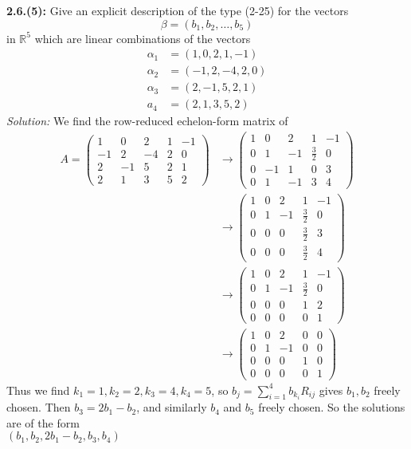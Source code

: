 \documentclass[a4paper]{article}
\theoremstyle{plain}%
\theoremstyle{definition}
\theoremstyle{remark}
\begin{document}
\textbf{2.6.(5):} Give an explicit description of the type (2-25) for the
vectors
\[
\beta = \left( b_1, b_2, \ldots, b_5 \right) 
\] 
in $\mathbb{R}^{5}$ which are linear combinations of the vectors
\begin{align*}
    \alpha_1 &= \left( 1, 0, 2, 1, -1 \right) \\
    \alpha_2 &= \left( -1,2,-4,2,0 \right) \\
    \alpha_3 &= \left( 2,-1,5,2,1 \right) \\
    a_4 &= \left( 2,1,3,5,2 \right) 
\end{align*}
\textit{Solution:} We find the row-reduced echelon-form matrix of
\begin{align*}
    A = \begin{pmatrix} 1 &0 & 2 & 1 &-1\\
        -1 & 2 & -4 & 2 &0\\
        2 & -1 & 5 & 2 &1\\
        2 & 1 & 3 & 5 & 2
    \end{pmatrix} 
    &\to 
    \begin{pmatrix} 
        1 & 0 & 2 & 1 & -1\\
        0 & 1 & -1 & \frac{3}{2} & 0\\
        0 & -1 & 1 & 0 & 3\\
        0 & 1 & -1 & 3 & 4
    \end{pmatrix} \\
    &\to 
    \begin{pmatrix} 
        1 & 0 & 2 & 1 & -1\\
        0 & 1 & -1 & \frac{3}{2} & 0\\
        0 & 0 & 0 & \frac{3}{2} & 3\\
        0 & 0 & 0 & \frac{3}{2} & 4
    \end{pmatrix} \\
    &\to 
    \begin{pmatrix} 
        1 & 0 & 2 & 1 & -1\\
        0 & 1 & -1 & \frac{3}{2} & 0\\
        0 & 0 & 0 & 1 & 2\\
        0 & 0 & 0 & 0 & 1
    \end{pmatrix}\\
    &\to 
    \begin{pmatrix} 
        1 & 0 & 2 & 0 & 0\\
        0 & 1 & -1 & 0 & 0\\
        0 & 0 & 0 & 1 & 0\\
        0 & 0 & 0 & 0 & 1
    \end{pmatrix} 
\end{align*}
Thus we find
$k_1 = 1, k_2 = 2, k_3 = 4, k_4 = 5$, so
$b_j = \sum_{i=1}^{4} b_{k_i}R_{i j}$ gives
$b_1, b_2$ freely chosen. Then
$b_3 = 2 b_1 - b_2$, and similarly
$b_4$ and $b_5$ freely chosen. So the solutions are of the form\\
$\left( b_1, b_2, 2b_1 - b_2, b_3, b_4 \right) $
\end{document}
